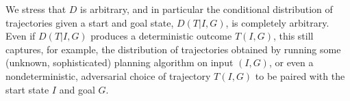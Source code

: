 \documentclass[letterpaper]{article}
\begin{document}
We stress that $D$ is arbitrary, and in particular the conditional distribution
of trajectories given a start and goal state, $D(T|I,G)$, is completely 
arbitrary. Even if $D(T|I,G)$ produces a deterministic outcome $T(I,G)$, this
still captures, for example, the distribution of trajectories obtained
by running some (unknown, sophisticated) planning algorithm on input $(I,G)$, or
even a nondeterministic, adversarial choice of trajectory $T(I,G)$ to 
be paired with the start state $I$ and goal $G$.


\end{document}
